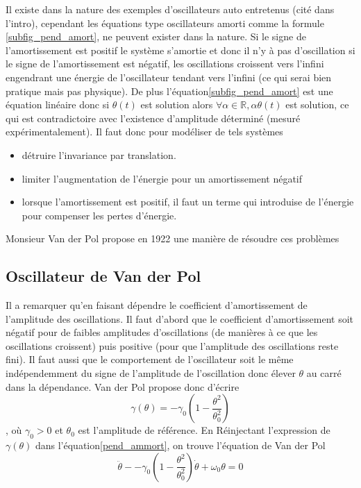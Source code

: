 \documentclass{article}
\begin{document}
Il existe dans la nature des exemples d'oscillateurs auto entretenus (cité dans l'intro), cependant les équations type oscillateurs amorti comme la formule \ref{subfig_pend_amort}, ne peuvent exister dans la nature. Si le signe de l'amortissement est positif le système s'amortie et donc il n'y à pas d'oscillation si le signe de l'amortissement est négatif, les oscillations croissent vers l'infini engendrant une énergie de l'oscillateur tendant vers l'infini (ce qui serai bien pratique  mais pas physique). De plus l'équation\ref{subfig_pend_amort} est une équation linéaire donc si $\theta(t)$ est solution alors $\forall\alpha\in\mathbb{R}, \alpha \theta(t) $ est solution, ce qui est contradictoire avec l'existence d'amplitude déterminé (mesuré expérimentalement). Il faut donc pour modéliser de tels systèmes 
\begin{itemize}
    \item détruire l'invariance par translation.
    \item limiter l'augmentation de l'énergie pour un amortissement négatif
    \item lorsque l'amortissement est positif, il faut un terme qui introduise de l'énergie pour compenser les pertes d'énergie. 
\end{itemize}

Monsieur Van der Pol propose en 1922 une manière de résoudre ces problèmes
\subsection{Oscillateur de Van der Pol}
Il a remarquer qu'en faisant dépendre le coefficient d'amortissement de l'amplitude des oscillations. Il faut d'abord que le coefficient d'amortissement soit négatif pour de faibles amplitudes d'oscillations (de manières à ce que les oscillations croissent) puis positive (pour que l'amplitude des oscillations reste fini). Il faut aussi que le comportement de l'oscillateur soit le même indépendemment du signe de l'amplitude de l'oscillation donc élever $\theta$ au carré dans la dépendance.
Van der Pol propose donc d'écrire $$\gamma(\theta)= -\gamma_0\left(1-\frac{\theta^2}{\theta_0^2} \right)$$, où $\gamma_0>0$ et $\theta_0$ est l'amplitude de référence. En Réinjectant l'expression de $\gamma(\theta)$ dans l'équation\ref{pend_ammort}, on trouve l'équation de Van der Pol
\begin{equation}
    \ddot\theta - -\gamma_0\left(1-\frac{\theta^2}{\theta_0^2} \right)\dot\theta +\omega_0\theta =0
    \label{eq:VanderPol}
\end{equation}
\end{document}
